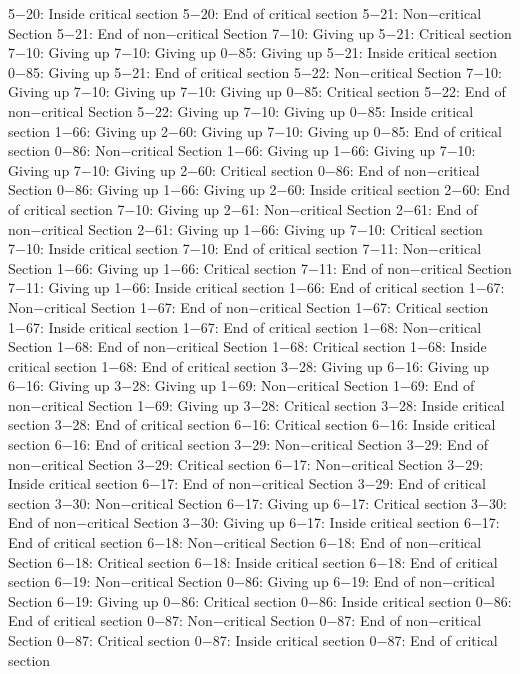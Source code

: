 5−20: Inside critical section
5−20: End of critical section
5−21: Non−critical Section
5−21: End of non−critical Section
7−10: Giving up
5−21: Critical section
7−10: Giving up
7−10: Giving up
0−85: Giving up
5−21: Inside critical section
0−85: Giving up
5−21: End of critical section
5−22: Non−critical Section
7−10: Giving up
7−10: Giving up
7−10: Giving up
0−85: Critical section
5−22: End of non−critical Section
5−22: Giving up
7−10: Giving up
0−85: Inside critical section
1−66: Giving up
2−60: Giving up
7−10: Giving up
0−85: End of critical section
0−86: Non−critical Section
1−66: Giving up
1−66: Giving up
7−10: Giving up
7−10: Giving up
2−60: Critical section
0−86: End of non−critical Section
0−86: Giving up
1−66: Giving up
2−60: Inside critical section
2−60: End of critical section
7−10: Giving up
2−61: Non−critical Section
2−61: End of non−critical Section
2−61: Giving up
1−66: Giving up
7−10: Critical section
7−10: Inside critical section
7−10: End of critical section
7−11: Non−critical Section
1−66: Giving up
1−66: Critical section
7−11: End of non−critical Section
7−11: Giving up
1−66: Inside critical section
1−66: End of critical section
1−67: Non−critical Section
1−67: End of non−critical Section
1−67: Critical section
1−67: Inside critical section
1−67: End of critical section
1−68: Non−critical Section
1−68: End of non−critical Section
1−68: Critical section
1−68: Inside critical section
1−68: End of critical section
3−28: Giving up
6−16: Giving up
6−16: Giving up
3−28: Giving up
1−69: Non−critical Section
1−69: End of non−critical Section
1−69: Giving up
3−28: Critical section
3−28: Inside critical section
3−28: End of critical section
6−16: Critical section
6−16: Inside critical section
6−16: End of critical section
3−29: Non−critical Section
3−29: End of non−critical Section
3−29: Critical section
6−17: Non−critical Section
3−29: Inside critical section
6−17: End of non−critical Section
3−29: End of critical section
3−30: Non−critical Section
6−17: Giving up
6−17: Critical section
3−30: End of non−critical Section
3−30: Giving up
6−17: Inside critical section
6−17: End of critical section
6−18: Non−critical Section
6−18: End of non−critical Section
6−18: Critical section
6−18: Inside critical section
6−18: End of critical section
6−19: Non−critical Section
0−86: Giving up
6−19: End of non−critical Section
6−19: Giving up
0−86: Critical section
0−86: Inside critical section
0−86: End of critical section
0−87: Non−critical Section
0−87: End of non−critical Section
0−87: Critical section
0−87: Inside critical section
0−87: End of critical section
